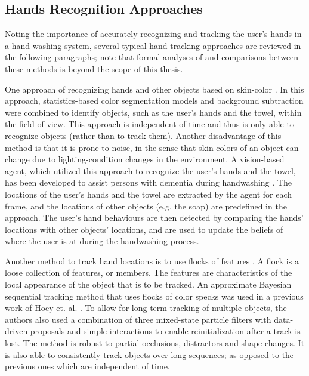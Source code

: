 \subsection{Hands Recognition Approaches}

Noting the importance of accurately recognizing and tracking the user's hands in a hand-washing system, several typical hand tracking approaches are reviewed in the following paragraphs; note that formal analyses of and comparisons between these methods is beyond the scope of this thesis.

One approach of recognizing hands and other objects based on skin-color \cite{mihailidis2004use}. In this approach, statistics-based color segmentation models and background subtraction were combined to identify objects, such as the user's hands and the towel, within the field of view. This approach is independent of time and thus is only able to recognize objects (rather than to track them). Another disadvantage of this method is that it is prone to noise, in the sense that skin colors of an object can change due to lighting-condition changes in the environment. A vision-based agent, which utilized this approach to recognize the user's hands and the towel, has been developed to assist persons with dementia during handwashing \cite{boger2005decision}. The locations of the user's hands and the towel are extracted by the agent for each frame, and the locations of other objects (e.g. the soap) are predefined in the approach. The user's hand behaviours are then detected by comparing the hands' locations with other objects' locations, and are used to update the beliefs of where the user is at during the handwashing process. 

Another method to track hand locations is to use flocks of features \cite{hoey2006tracking}. A flock is a loose collection of features, or members. The features are characteristics of the local appearance of the object that is to be tracked. An approximate Bayesian sequential tracking method that uses flocks of color specks was used in a previous work of Hoey et. al. \cite{hoey2006tracking}. To allow for long-term tracking of multiple objects, the authors also used a combination of three mixed-state particle filters \cite{isard1998mixed} with data-driven proposals \cite{okuma2004boosted} and simple interactions to enable reinitialization after a track is lost. The method is robust to partial occlusions, distractors and shape changes. It is also able to consistently track objects over long sequences; as opposed to the previous ones which are independent of time.

